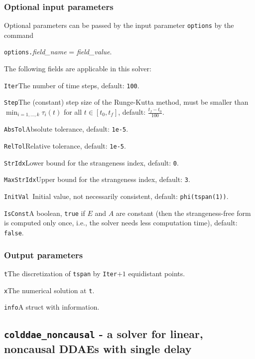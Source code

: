 \documentclass[final,reqno]{siamltex}
\renewenvironment{itemize}[1]{\begin{compactitem}#1}{\end{compactitem}}
\begin{document}
\subsubsection{Optional input parameters}
Optional parameters can be passed by the input parameter {\tt options} by the command 
\begin{center}
{\tt options.}{\it field\_name} = {\it field\_value}.
\end{center}
The following fields are applicable in this solver:
\begin{itemize}
\item {\tt Iter}\quad        The number of time steps, default: {\tt 100}.
\item {\tt Step}\quad        The (constant) step size of the Runge-Kutta method, must be smaller than
          $\min_{i=1,\ldots,k}\tau_i(t)$ for all $t\in[t_0,t_f]$, default: $\frac{t_f-t_0}{100}$.
\item {\tt AbsTol}\quad       Absolute tolerance, default:  {\tt 1e-5}.
\item {\tt RelTol}\quad       Relative tolerance, default:  {\tt 1e-5}.
\item {\tt StrIdx}\quad       Lower bound for the strangeness index,  default: {\tt 0}.
\item {\tt MaxStrIdx}\quad    Upper bound for the strangeness index,  default: {\tt 3}.
\item {\tt InitVal  }\quad    Initial value, not necessarily consistent,  default: {\tt phi(tspan(1))}.
\item {\tt IsConst}\quad      A boolean, {\tt true} if $E$ and $A$ are constant (then the strangeness-free form is computed only once, i.e.,  the solver needs less computation time), default: {\tt false}.
\end{itemize}

\subsubsection{Output parameters}
\begin{itemize}
\item {\tt t}\quad The discretization of {\tt tspan} by {\tt Iter}$+1$ equidistant points.
\item {\tt x}\quad The numerical solution at {\tt t}.
\item {\tt info}\quad A struct with information.
\end{itemize}


\subsection{{\tt colddae\_noncausal} - a solver for linear, noncausal DDAEs with single delay}
\end{document}
